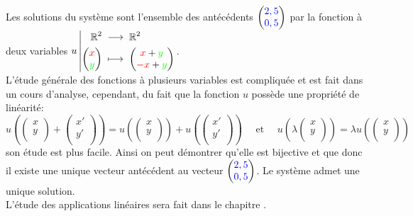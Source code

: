 \documentclass{book}
\begin{document}
Les solutions du système sont l'ensemble des antécédents $\begin{pmatrix}
 {\color{blue}2,5}   \\
 {\color{blue}0,5}  \\
\end{pmatrix}$ par la fonction à deux variables ${u}\left|\begin{aligned}{\mathbb{R}^2}&\;\longrightarrow\;{\mathbb{R}^2}\\{\begin{pmatrix}
  {\color{red}x}    \\
 {\color{green}y}   \\
\end{pmatrix}}&\;\longmapsto\;{\begin{pmatrix}
  {\color{red}x} +{\color{green}y}   \\
  {\color{red}-x} +{\color{green}y}   \\
\end{pmatrix}}\end{aligned}\right.$.\\
L'étude générale des fonctions à plusieurs variables est compliquée et est fait dans un cours d'analyse,  
cependant,  du fait que la fonction $u$ possède une propriété de linéarité:
 $$u(\begin{pmatrix}
 {x}    \\
{y}   \\
\end{pmatrix}+\begin{pmatrix}
 {x'}    \\
{y'}   \\
\end{pmatrix})=u(\begin{pmatrix}
 {x}    \\
{y}   \\
\end{pmatrix})+u(\begin{pmatrix}
 {x'}    \\
{y'}   \\
\end{pmatrix}) \quad\text{ et }\quad u(\lambda \begin{pmatrix}
 {x}    \\
{y}   \\
\end{pmatrix})=\lambda u(\begin{pmatrix}
 {x}    \\
{y}   \\
\end{pmatrix})$$
son étude est plus facile. Ainsi on peut démontrer qu'elle est bijective et que donc il existe une unique vecteur antécédent au vecteur $\begin{pmatrix}
 {\color{blue}2,5}   \\
 {\color{blue}0,5}  \\
\end{pmatrix}$. Le système admet une unique solution.\\
L'étude des applications linéaires sera fait dans le chapitre .
\end{document}
